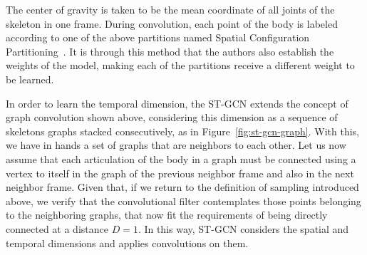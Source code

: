 The center of gravity is taken to be the mean coordinate of all joints of the skeleton in one frame. During convolution, each point of the body is labeled according to one of the above partitions named Spatial Configuration Partitioning~\cite{st-gcn-2018}. It is through this method that the authors also establish the weights of the model, making each of the partitions receive a different weight to be learned.

    
In order to learn the temporal dimension, the ST-GCN extends the concept of graph convolution shown above, considering this dimension as a sequence of skeletons graphs stacked consecutively, as in Figure~\ref{fig:st-gcn-graph}. With this, we have in hands a set of graphs that are neighbors to each other. Let us now assume that each articulation of the body in a graph must be connected using a vertex to itself in the graph of the previous neighbor frame and also in the next neighbor frame. Given that, if we return to the definition of sampling introduced above, we verify that the convolutional filter contemplates those points belonging to the neighboring graphs, that now fit the requirements of being directly connected at a distance $D = 1$. In this way, ST-GCN considers the spatial and temporal dimensions and applies convolutions on them.




